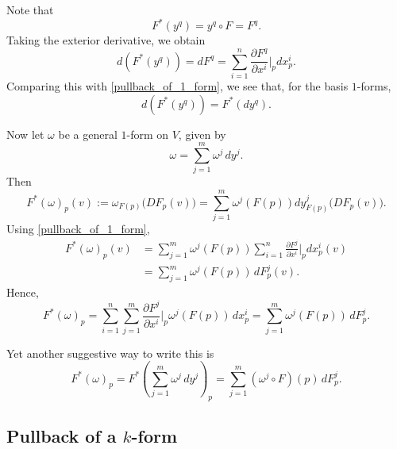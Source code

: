 Note that
\[
F^*(y^q)=y^q\circ F=F^q.
\]
Taking the exterior derivative, we obtain
\[
d(F^*(y^q))
=
dF^q
=
\sum_{i=1}^n
\frac{\partial F^q}{\partial x^i}\Big|_p
dx^i_p.
\]
Comparing this with \eqref{pullback_of_1_form}, we see that, for the
basis $1$-forms,
\[
d(F^*(y^q))=F^*(dy^q).
\]

Now let $\omega$ be a general $1$-form on $V$, given by
\[
\omega
=
\sum_{j=1}^m \omega^j\,dy^j.
\]
Then
\[
F^*(\omega)_p(v)
:=
\omega_{F(p)}\bigl(DF_p(v)\bigr)
=
\sum_{j=1}^m
\omega^j(F(p))
dy^j_{F(p)}\bigl(DF_p(v)\bigr).
\]
Using \eqref{pullback_of_1_form},
\[
\begin{aligned}
F^*(\omega)_p(v)
&=
\sum_{j=1}^m
\omega^j(F(p))
\sum_{i=1}^n
\frac{\partial F^j}{\partial x^i}\Big|_p
dx^i_p(v)
\\
&=
\sum_{j=1}^m
\omega^j(F(p))\,dF^j_p(v).
\end{aligned}
\]
Hence,
\[
F^*(\omega)_p
=
\sum_{i=1}^n\sum_{j=1}^m
\frac{\partial F^j}{\partial x^i}\Big|_p
\omega^j(F(p))\,dx^i_p
=
\sum_{j=1}^m
\omega^j(F(p))\,dF^j_p.
\]

Yet another suggestive way to write this is
\[
F^*(\omega)_p
=
F^*\left(\sum_{j=1}^m\omega^j\,dy^j\right)_p
=
\sum_{j=1}^m
(\omega^j\circ F)(p)\,dF^j_p.
\]

\subsection{Pullback of a $k$-form}

